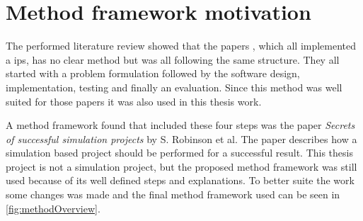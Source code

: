 \section{Method framework motivation}\label{sec:methodFramework}

The performed literature review showed that the papers \cite{BluetoothLowEnergy2018, DevelopmentSmartphoneBasedUniversity2021, PracticalFingerprintingLocalization2017}, which all implemented a \acrfull{ips}, has no clear method but was all following the same structure.
They all started with a problem formulation followed by the software design, implementation, testing and finally an evaluation.
Since this method was well suited for those papers it was also used in this thesis work.

\bigskip

A method framework found that included these four steps was the paper \textit{Secrets of successful simulation projects} \cite{SecretsSuccessfulSimulation1995} by S. Robinson et al.
The paper describes how a simulation based project should be performed for a successful result.
This thesis project is not a simulation project, but the proposed method framework  was still used because of its well defined steps and explanations.
To better suite the work some changes was made and the final method framework used can be seen in \cref{fig:methodOverview}.



